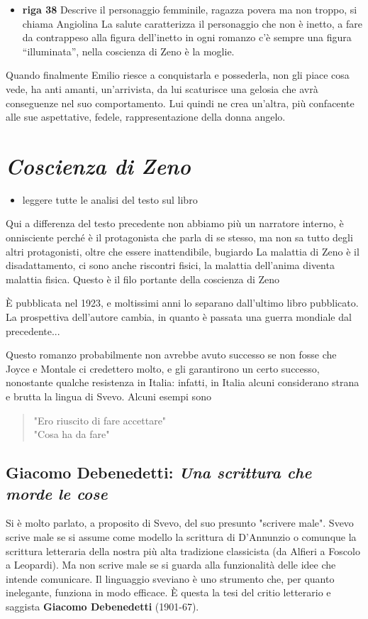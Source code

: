 \documentclass[a4paper, twoside, titlepage]{book}
\newcommand{\elenco}[1]{%
\begin{itemize}
#1
\end{itemize}}
\newcommand{\citazione}[1]{%
  \begin{quotation}
  \noindent #1
  \end{quotation}}
\begin{document}
\elenco{\item \textbf{riga 38} Descrive il personaggio femminile, ragazza povera ma non troppo, si chiama Angiolina
La salute caratterizza il personaggio che non è inetto, a fare da contrappeso alla figura dell’inetto in ogni romanzo c’è sempre una figura “illuminata”, nella coscienza di Zeno è la moglie.
}

Quando finalmente Emilio riesce a conquistarla e possederla, non gli piace cosa vede, ha anti amanti, un’arrivista, da lui scaturisce una gelosia che avrà conseguenze nel suo comportamento. Lui quindi ne crea un’altra, più confacente alle sue aspettative, fedele, rappresentazione della donna angelo.


\chapter{\textit{Coscienza di Zeno}}

\elenco{\item leggere tutte le analisi del testo sul libro}

Qui a differenza del testo precedente non abbiamo più un narratore interno, è onnisciente perché è il protagonista che parla di se stesso, ma non sa tutto degli altri protagonisti, oltre che essere inattendibile, bugiardo
La malattia di Zeno è il disadattamento, ci sono anche riscontri fisici, la malattia dell’anima diventa malattia fisica. Questo è il filo portante della coscienza di Zeno

È pubblicata nel 1923, e moltissimi anni lo separano dall'ultimo libro pubblicato.
La prospettiva dell'autore cambia, in quanto è passata una guerra mondiale dal precedente...

Questo romanzo probabilmente non avrebbe avuto successo se non fosse che Joyce e Montale ci credettero molto, e gli garantirono un certo successo, nonostante qualche resistenza in Italia: infatti, in Italia alcuni considerano strana e brutta la lingua di Svevo. Alcuni esempi sono
\citazione{"Ero riuscito di fare accettare"\\
"Cosa ha da fare"}

\section{Giacomo Debenedetti: \textit{Una scrittura che morde le cose}}
Si è molto parlato, a proposito di Svevo, del suo presunto "scrivere male". Svevo scrive male se si assume come modello la scrittura di D'Annunzio o comunque la scrittura letteraria della nostra più alta tradizione classicista (da Alfieri a Foscolo a Leopardi). Ma non scrive male se si guarda alla funzionalità delle idee che intende comunicare. Il linguaggio sveviano è uno strumento che, per quanto inelegante, funziona in modo efficace. È questa la tesi del critio letterario e saggista \textbf{Giacomo Debenedetti} (1901-67).
\end{document}
